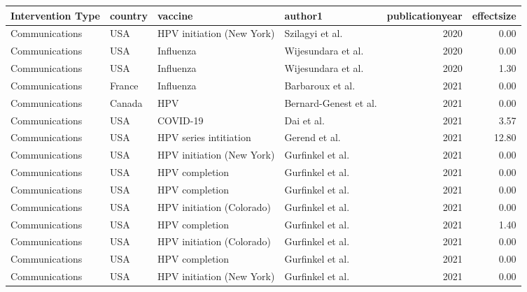 
\begin{tabular}{llllrr}
\toprule
Intervention Type & country & vaccine & author1 & publicationyear & effectsize\\
\midrule
Communications & USA & HPV initiation (New York) & Szilagyi et al. & 2020 & 0.00\\
Communications & USA & Influenza & Wijesundara et al. & 2020 & 0.00\\
Communications & USA & Influenza & Wijesundara et al. & 2020 & 1.30\\
Communications & France & Influenza & Barbaroux et al. & 2021 & 0.00\\
Communications & Canada & HPV & Bernard-Genest et al. & 2021 & 0.00\\
\addlinespace
Communications & USA & COVID-19 & Dai et al. & 2021 & 3.57\\
Communications & USA & HPV series intitiation & Gerend et al. & 2021 & 12.80\\
Communications & USA & HPV initiation (New York) & Gurfinkel et al. & 2021 & 0.00\\
Communications & USA & HPV completion & Gurfinkel et al. & 2021 & 0.00\\
Communications & USA & HPV completion & Gurfinkel et al. & 2021 & 0.00\\
\addlinespace
Communications & USA & HPV initiation (Colorado) & Gurfinkel et al. & 2021 & 0.00\\
Communications & USA & HPV completion & Gurfinkel et al. & 2021 & 1.40\\
Communications & USA & HPV initiation (Colorado) & Gurfinkel et al. & 2021 & 0.00\\
Communications & USA & HPV completion & Gurfinkel et al. & 2021 & 0.00\\
Communications & USA & HPV initiation (New York) & Gurfinkel et al. & 2021 & 0.00\\
\bottomrule
\end{tabular}
